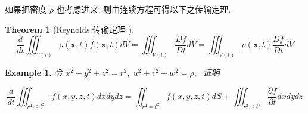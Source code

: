 \documentclass[11pt]{article}
\newtheorem{theorem}{Theorem}[subsection]
\newtheorem{example}{Example}[subsection]
\begin{document}
\newpage 

如果把密度 $ \rho $ 也考虑进来, 则由连续方程可得以下之传输定理.


\begin{theorem}[\kaishu Reynolds 传输定理 \uppercase\expandafter{}]
	\begin{equation}
	\frac{d}{{dt}}\iiint_{V\left( t \right)} {\rho \left( {\boldsymbol{x},t} \right)f\left( {\boldsymbol{x},t} \right)dV} = \iiint_{V\left( t \right)} {\frac{{Df}}{{Dt}}dV} = \iiint_{V\left( t \right)} {\rho \left( {\boldsymbol{x},t} \right)\frac{{Df}}{{Dt}}dV}
	\label{eq5.2.6}
	\end{equation}
\end{theorem}

\begin{example}
	令 ${x^2} + {y^2} + {z^2} = {r^2},\;{u^2} + {v^2} + {w^2} = \rho ,\;$ 证明
	
	\begin{equation}
	\frac{d}{{dt}}\iiint_{{r^2} \leqslant {t^2}} {f\left( {x,y,z,t} \right)dxdydz} = \iint_{{r^2} = {t^2}} {f\left( {x,y,z,t} \right)dS} + \iiint_{{r^2} \leqslant {t^2}} {\frac{{\partial f}}{{\partial t}}dxdydz}
	\label{eq5.2.7}
	\end{equation}
\end{example}
\end{document}

